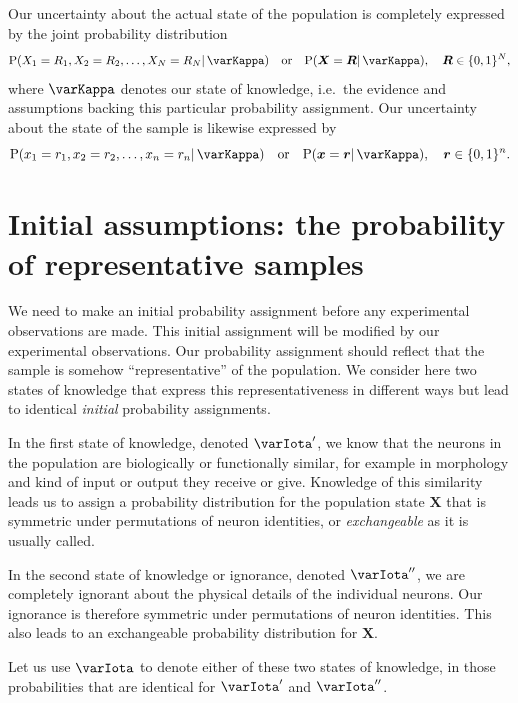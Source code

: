 \documentclass{article}
\theoremstyle{remark}
\theoremstyle{innote}
\renewcommand*{\|}{\mathpunct{|}}%
\DeclarePairedDelimiter\set{\{}{\}}
\newcommand*{\p}{\mathrm{P}}%
\newcommand*{\ie}{{i.e.}}
\theoremstyle{simple}
\newcommand*{\yxx}{x}%
\newcommand*{\yx}{\bm{\yxx}}%
\newcommand*{\yX}{\bm{X}}%
\newcommand*{\yr}{\bm{r}}%
\newcommand*{\yR}{\bm{R}}%
\newcommand*{\yH}{\varIota}
\newcommand*{\yHc}{\varKappa}
\newcommand*{\yHp}{\varIota'}
\newcommand*{\yHi}{\varIota''}
\begin{document}
Our uncertainty about the actual state of the population is completely
expressed by the joint probability distribution
\begin{equation}
  \label{eq:joint_plaus}
  \p(X_1=R_1, X_2=R_2, \dotsc, X_N=R_N \| \yHc) \quad\text{or}\quad
\p(\yX =\yR \| \yHc), \quad \yR \in \set{0,1}^N,
\end{equation}
where $\yHc$ denotes our state of knowledge, \ie\ the evidence and
assumptions backing this particular probability assignment. Our uncertainty
about the state of the sample is likewise expressed by
\begin{equation}
  \label{eq:sample_plaus}
  \p(x_1=r_1, x_2=r_2, \dotsc, x_n=r_n \| \yHc) \quad\text{or}\quad
\p(\yx =\yr \| \yHc), \quad \yr \in \set{0,1}^n.
\end{equation}



\section{Initial assumptions: the probability of representative samples}
\label{sec:prob_samples}

We need to make an initial probability assignment before any experimental
observations are
made. %
This initial assignment will be modified by our experimental observations.
Our probability assignment should reflect that the sample is somehow
\enquote{representative} of the population. We consider here two states of
knowledge that express this representativeness in different ways but lead
to identical \emph{initial} probability assignments.

In the first state of knowledge, denoted $\yHp$, we know that the neurons
in the population are biologically or functionally similar, for
example in morphology and kind of input or output they receive or give.
Knowledge of this similarity leads us to assign a probability distribution
for the population state $\yX$ that is symmetric under permutations of
neuron identities, or \emph{exchangeable} as it is usually called.

In the second state of knowledge or ignorance, denoted $\yHi$, we are
completely ignorant about the physical details of the individual neurons.
Our ignorance is therefore symmetric under permutations of neuron
identities. This also leads to an exchangeable probability distribution for
$\yX$.

Let us use $\yH$ to denote either of these two states of knowledge, in those
probabilities that are identical for $\yHp$ and $\yHi$.
\end{document}
